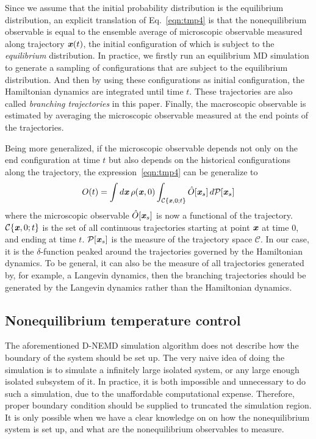 \documentclass[a4paper,preprint,unsortedaddress,onecolumn]{revtex4-1}
\newcommand{\vect}[1]{\textbf{\textit{#1}}}
\begin{document}
Since we assume that the initial
probability distribution is the equilibrium distribution, an
explicit translation of Eq.~\eqref{eqn:tmp4} is that the
nonequilibrium observable is equal to the ensemble average of
microscopic observable measured along trajectory $\vect x(t)$, the
initial configuration of which is subject to the \emph{equilibrium}
distribution. In practice, we firstly run an equilibrium MD simulation
to generate a sampling of configurations that are subject to the
equilibrium distribution. And then by using these configurations as
initial configuration, the Hamiltonian dynamics are integrated until
time $t$. These trajectories are also called \emph{branching
  trajectories} in this paper. Finally, the macroscopic observable is
estimated by averaging the microscopic observable measured at the end
points of the trajectories.

Being more generalized, if the microscopic observable depends not only on the end
configuration at time $t$ but also depends on the historical
configurations along the trajectory, the expression~\eqref{eqn:tmp4} can be generalize to
\begin{align}
  O(t) = \int d\vect x\,\rho(\vect x, 0) \int_{\mathcal C\{\vect x, 0; t\}} \hat O[\vect x_s] \,d\mathcal P[\vect x_s] 
\end{align}
where the microscopic observable $ \hat O[\vect x_s] $ is now a
functional of the trajectory.  $\mathcal C\{\vect x, 0; t\}$ is the
set of all continuous trajectories starting at point $\vect x$ at time
0, and ending at time $t$. $\mathcal P[\vect x_s] $ is the measure of
the trajectory space $\mathcal C$.  In our case, it is the
$\delta$-function peaked around the trajectories governed by the
Hamiltonian dynamics. To be general, it can also be the measure of all
trajectories generated by, for example, a Langevin dynamics, then the
branching trajectories should be generated by the Langevin
dynamics rather than the Hamiltonian dynamics.


\subsection{Nonequilibrium temperature control}\label{sec:tmp2b}

The aforementioned D-NEMD simulation algorithm
does not describe how the boundary of the system should be set up.
The very naive idea of doing the simulation
is to simulate a infinitely large isolated system, or any large enough
isolated subsystem of it. In practice, it is both impossible and unnecessary to
do such a simulation, due to the unaffordable computational expense.
Therefore, proper boundary condition should be supplied
to truncated the simulation region. It is only possible when we
have a clear knowledge on
on how the nonequilibrium system is set up,
and what are the nonequilibrium observables to measure.
\end{document}
